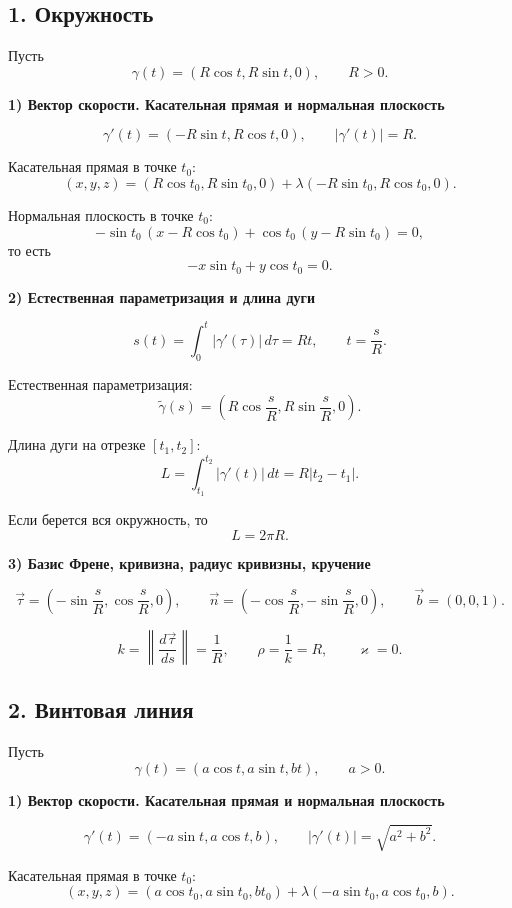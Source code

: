 \documentclass[12pt,a4paper]{article}
\begin{document}
\subsection*{1. Окружность}

Пусть
\[
\gamma(t) = (R\cos t, R\sin t, 0), \qquad R > 0.
\]

\textbf{1) Вектор скорости. Касательная прямая и нормальная плоскость}

\[
\gamma'(t) = (-R\sin t, R\cos t, 0), \qquad |\gamma'(t)| = R.
\]

Касательная прямая в точке $t_0$:
\[
(x,y,z) = (R\cos t_0, R\sin t_0, 0) + \lambda(-R\sin t_0, R\cos t_0, 0).
\]

Нормальная плоскость в точке $t_0$:
\[
-\sin t_0\,(x - R\cos t_0) + \cos t_0\,(y - R\sin t_0) = 0,
\]
то есть
\[
-x\sin t_0 + y\cos t_0 = 0.
\]

\textbf{2) Естественная параметризация и длина дуги}

\[
s(t) = \int_0^t |\gamma'(\tau)|\,d\tau = Rt, \qquad t = \frac{s}{R}.
\]

Естественная параметризация:
\[
\tilde{\gamma}(s) = \left(R\cos \frac{s}{R}, R\sin \frac{s}{R}, 0\right).
\]

Длина дуги на отрезке $[t_1,t_2]$:
\[
L = \int_{t_1}^{t_2} |\gamma'(t)|\,dt = R|t_2 - t_1|.
\]

Если берется вся окружность, то
\[
L = 2\pi R.
\]

\textbf{3) Базис Френе, кривизна, радиус кривизны, кручение}

\[
\vec{\tau} = \left(-\sin \frac{s}{R}, \cos \frac{s}{R}, 0\right), \qquad
\vec{n} = \left(-\cos \frac{s}{R}, -\sin \frac{s}{R}, 0\right), \qquad
\vec{b} = (0,0,1).
\]

\[
k = \left\| \frac{d\vec{\tau}}{ds} \right\| = \frac{1}{R}, \qquad
\rho = \frac{1}{k} = R, \qquad
\varkappa = 0.
\]

\subsection*{2. Винтовая линия}

Пусть
\[
\gamma(t) = (a\cos t, a\sin t, bt), \qquad a > 0.
\]

\textbf{1) Вектор скорости. Касательная прямая и нормальная плоскость}

\[
\gamma'(t) = (-a\sin t, a\cos t, b), \qquad |\gamma'(t)| = \sqrt{a^2+b^2}.
\]

Касательная прямая в точке $t_0$:
\[
(x,y,z) = (a\cos t_0, a\sin t_0, bt_0) + \lambda(-a\sin t_0, a\cos t_0, b).
\]
\end{document}
